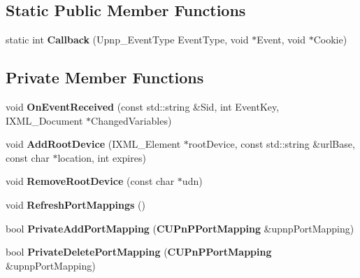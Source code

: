 \subsection*{Static Public Member Functions}
\begin{DoxyCompactItemize}
\item 
static int {\bfseries Callback} (Upnp\_\-EventType EventType, void $\ast$Event, void $\ast$Cookie)\label{classCUPnPControlPoint_aaed5e2683553eefab3db9670eeb8eb05}

\end{DoxyCompactItemize}
\subsection*{Private Member Functions}
\begin{DoxyCompactItemize}
\item 
void {\bfseries OnEventReceived} (const std::string \&Sid, int EventKey, IXML\_\-Document $\ast$ChangedVariables)\label{classCUPnPControlPoint_aebd9d414adf187b73833c46d2f2d1112}

\item 
void {\bfseries AddRootDevice} (IXML\_\-Element $\ast$rootDevice, const std::string \&urlBase, const char $\ast$location, int expires)\label{classCUPnPControlPoint_ab933c2239d7f51d1e8d142753f0467f5}

\item 
void {\bfseries RemoveRootDevice} (const char $\ast$udn)\label{classCUPnPControlPoint_afeb1fd98a797bf7b72101d8c2bb6825a}

\item 
void {\bfseries RefreshPortMappings} ()\label{classCUPnPControlPoint_ac47536bf13be8a5a533eec68388049d3}

\item 
bool {\bfseries PrivateAddPortMapping} ({\bf CUPnPPortMapping} \&upnpPortMapping)\label{classCUPnPControlPoint_a1181ef67e2e7f253622b23cfb8fc79f6}

\item 
bool {\bfseries PrivateDeletePortMapping} ({\bf CUPnPPortMapping} \&upnpPortMapping)\label{classCUPnPControlPoint_a8d2a45dd13fc75e628f8077b6035cfce}

\end{DoxyCompactItemize}
